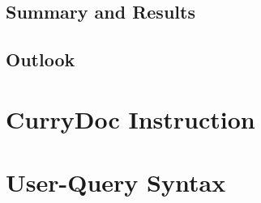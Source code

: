 \documentclass[%
	pdftex,%
	a4paper,%
	oneside,%
	chapterprefix,%
	headsepline,%
	12pt%
]{scrbook}
\begin{document}
\section{Summary and Results}
\section{Outlook}

\newpage
{}
\setcounter{page}{\value{roemisch}}

\appendix
\chapter{CurryDoc Instruction}\label{a:currydoc}

\chapter{User-Query Syntax}\label{a:syntax}



% 
\end{document}
